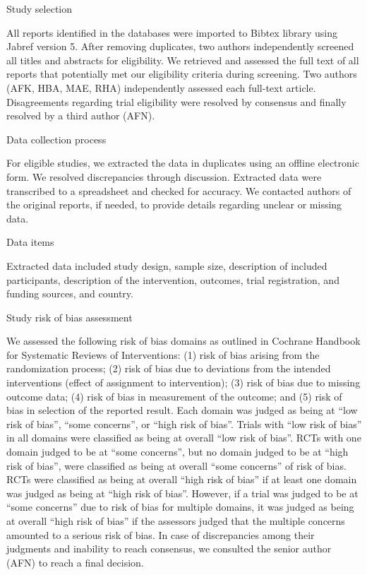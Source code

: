 \documentclass[
  letterpaper,
  DIV=11,
  numbers=noendperiod]{scrartcl}
\begin{document}
Study selection

All reports identified in the databases were imported to Bibtex library
using Jabref version 5. After removing duplicates, two authors
independently screened all titles and abstracts for eligibility. We
retrieved and assessed the full text of all reports that potentially met
our eligibility criteria during screening. Two authors (AFK, HBA, MAE,
RHA) independently assessed each full-text article. Disagreements
regarding trial eligibility were resolved by consensus and finally
resolved by a third author (AFN).

Data collection process

For eligible studies, we extracted the data in duplicates using an
offline electronic form. We resolved discrepancies through discussion.
Extracted data were transcribed to a spreadsheet and checked for
accuracy. We contacted authors of the original reports, if needed, to
provide details regarding unclear or missing data.

Data items

Extracted data included study design, sample size, description of
included participants, description of the intervention, outcomes, trial
registration, and funding sources, and country.

Study risk of bias assessment

We assessed the following risk of bias domains as outlined in Cochrane
Handbook for Systematic Reviews of Interventions: (1) risk of bias
arising from the randomization process; (2) risk of bias due to
deviations from the intended interventions (effect of assignment to
intervention); (3) risk of bias due to missing outcome data; (4) risk of
bias in measurement of the outcome; and (5) risk of bias in selection of
the reported result. Each domain was judged as being at ``low risk of
bias'', ``some concerns'', or ``high risk of bias''. Trials with ``low
risk of bias'' in all domains were classified as being at overall ``low
risk of bias''. RCTs with one domain judged to be at ``some concerns'',
but no domain judged to be at ``high risk of bias'', were classified as
being at overall ``some concerns'' of risk of bias. RCTs were classified
as being at overall ``high risk of bias'' if at least one domain was
judged as being at ``high risk of bias''. However, if a trial was judged
to be at ``some concerns'' due to risk of bias for multiple domains, it
was judged as being at overall ``high risk of bias'' if the assessors
judged that the multiple concerns amounted to a serious risk of bias. In
case of discrepancies among their judgments and inability to reach
consensus, we consulted the senior author (AFN) to reach a final
decision.
\end{document}
